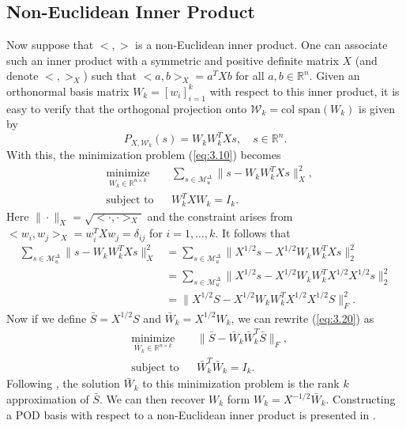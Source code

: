 \subsection{Non-Euclidean Inner Product} \label{sec:3.2.2}
Now suppose that $<,>$ is a non-Euclidean inner product. One can associate such an inner product with a symmetric and positive definite matrix $X$ (and denote $<,>_X$) such that $<a,b>_X = a^TXb$ for all $a,b\in \mathbb R^n$. Given an orthonormal basis matrix $W_k = [w_i]_{i=1}^k$ with respect to this inner product, it is easy to verify that the orthogonal projection onto $\mathcal W_k = \text{col\ span}(W_k)$ is given by
\begin{equation} \label{eq:3.19}
	P_{X,\mathcal W_k}(s) = W_kW_k^TXs, \quad s\in \mathbb R^{n}.
\end{equation}
With this, the minimization problem (\ref{eq:3.10}) becomes
\begin{equation} \label{eq:3.20}
\begin{aligned}
&  \underset{W_k\in\mathbb R^{n\times k}}{\text{minimize}}
& & \sum_{s\in \mathcal M_u^{\Delta}} \| s - W_kW_k^TXs\|^2_X, \\
& \text{subject to}
& & W_k^TXW_k=I_k.
\end{aligned}
\end{equation}
Here $\| \cdot \|_X = \sqrt{<\cdot , \cdot>_X}$ and the constraint arises from $<w_i,w_j>_X = w_i^TXw_j = \delta_{ij}$ for $i=1,\dots,k$. It follows that
\begin{equation} \label{eq:3.21}
\begin{aligned}
	\sum_{s\in \mathcal M_u^{\Delta}} \| s - W_kW_k^TXs\|^2_X &= \sum_{s\in \mathcal M_u^{\Delta}} \| X^{1/2}s - X^{1/2}W_kW_k^TXs\|_2^2 \\
	&= \sum_{s\in \mathcal M_u^{\Delta}} \| X^{1/2}s - X^{1/2}W_kW_k^TX^{1/2} X^{1/2}s\|_2^2 \\
	& = \| X^{1/2}S - X^{1/2}W_kW_k^TX^{1/2} X^{1/2}S \|_F^2.
\end{aligned}
\end{equation}
 Now if we define $\bar S = X^{1/2} S$ and $\bar W_k = X^{1/2} W_k$, we can rewrite (\ref{eq:3.20}) as 
\begin{equation} \label{eq:3.22}
\begin{aligned}
&  \underset{\bar W_k\in\mathbb R^{n\times k}}{\text{minimize}}
& & \| \bar S - \bar W_k \bar W_k^T \bar S\|_F, \\
& \text{subject to}
& & \bar W_k^T\bar W_k=I_k.
\end{aligned}
\end{equation}
Following , the solution $\bar W_k$ to this minimization problem is the rank $k$ approximation of $\bar S$. We can then recover $W_k$ form $W_k = X^{-1/2}\bar W_k$. Constructing a POD basis with respect to a non-Euclidean inner product is presented in .


